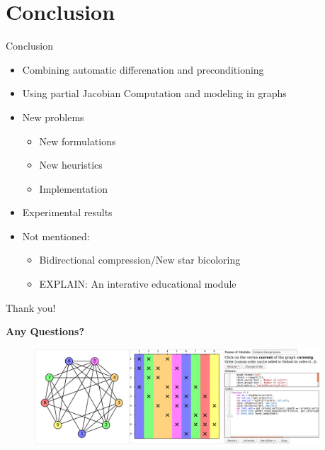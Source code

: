 \documentclass{beamer}
\begin{document}
\section{Conclusion}
\begin{frame}{Conclusion}
\begin{itemize}
\item Combining automatic differenation and preconditioning
\item Using partial Jacobian Computation and modeling in graphs
\item New problems
\begin{itemize}
\item New formulations
\item New heuristics
\item Implementation
\end{itemize}
\item Experimental results
\item Not mentioned:
\begin{itemize}
\item Bidirectional compression/New star bicoloring
\item EXPLAIN: An interative educational module
\end{itemize}
\end{itemize}
\end{frame}

\begin{frame}{Thank you!}
\begin{center}
\bf Any Questions?
\end{center}
\begin{figure}
\centering
\includegraphics[width=0.95\textwidth]{custom_module}
\end{figure}
\end{frame}
\end{document}
